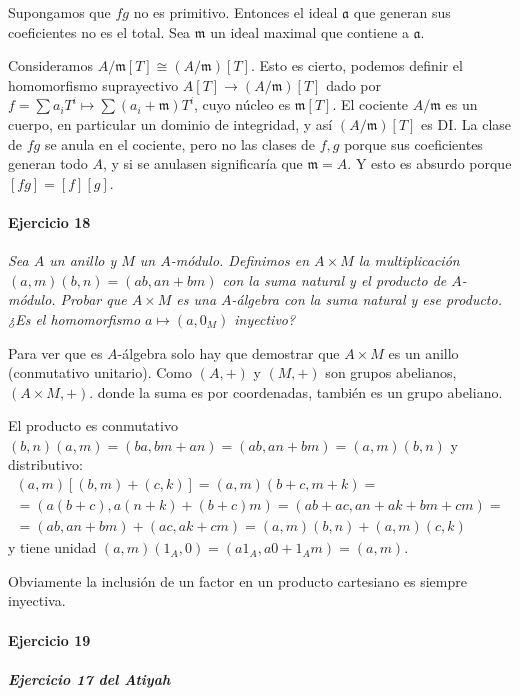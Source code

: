 \documentclass[../main.tex]{subfiles}
\begin{document}
Supongamos que $fg$ no es primitivo. Entonces el ideal $\mathfrak a$ que generan sus coeficientes no es el total. Sea $\mathfrak m$ un ideal maximal que contiene a $\mathfrak a$.

Consideramos $A/\mathfrak m [T] \cong (A/\mathfrak m)[T]$. Esto es cierto, podemos definir el homomorfismo suprayectivo $A[T] \to (A/\mathfrak m)[T]$ dado por $f= \sum a_iT^i \mapsto \sum (a_i+\mathfrak m) T^i$, cuyo núcleo es $\mathfrak m[T]$. El cociente $A/\mathfrak m$ es un cuerpo, en particular un dominio de integridad, y así $(A/\mathfrak m) [T]$ es DI. La clase de $fg$ se anula en el cociente, pero no las clases de $f, g$ porque sus coeficientes generan todo $A$, y si se anulasen significaría que $\mathfrak m = A$. Y esto es absurdo porque $[fg] = [f][g]$.

\paragraph{Ejercicio 18} \textit{Sea $A$ un anillo y $M$ un $A$-módulo. Definimos en $A\times M$ la multiplicación $(a,m)(b,n) = (ab,an+bm)$ con la suma natural y el producto de $A$-módulo. Probar que $A\times M$ es una $A$-álgebra con la suma natural y ese producto. ¿Es el homomorfismo $a\mapsto (a,0_M)$ inyectivo?}

Para ver que es $A$-álgebra solo hay que demostrar que $A\times M$ es un anillo (conmutativo unitario). Como $(A,+)$ y $(M,+)$ son grupos abelianos, $(A\times M, +)$. donde la suma es por coordenadas, también es un grupo abeliano.

El producto es conmutativo $(b,n)(a,m) = (ba,bm+an) = (ab,an+bm) = (a,m)(b,n)$ y distributivo:
\begin{multline}
  (a,m)[(b,m)+(c,k)]=(a,m)(b+c,m+k) = \\ =\left(a(b+c),a(n+k)+(b+c)m\right) = (ab+ac,an+ak+bm+cm) = \\ =(ab,an+bm)+(ac,ak+cm) = (a,m)(b,n)+(a,m)(c,k)
\end{multline}
y tiene unidad $(a,m)(1_A,0) = (a1_A,a0+1_A m) = (a,m)$.


Obviamente la inclusión de un factor en un producto cartesiano es siempre inyectiva.

\paragraph{Ejercicio 19}

\subparagraph{Ejercicio 17 del Atiyah}
\end{document}

